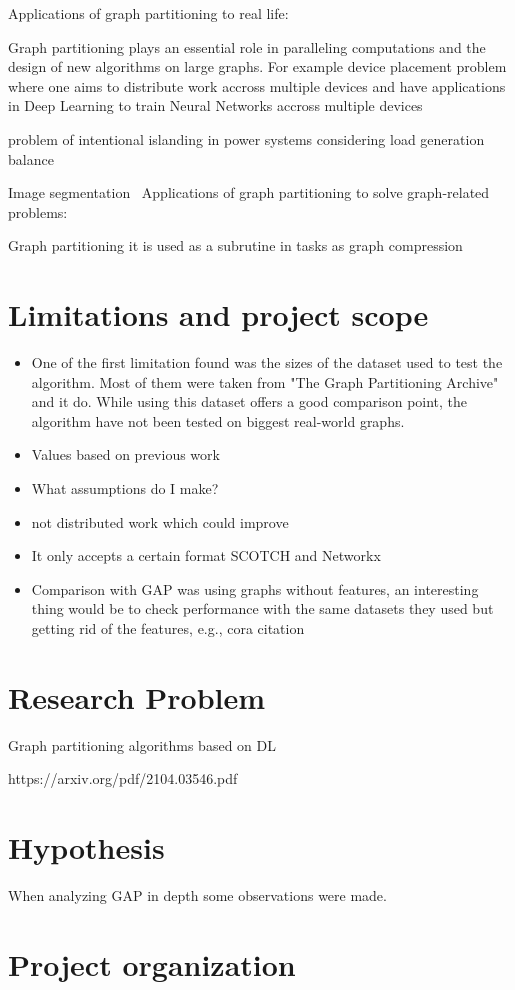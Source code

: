 Applications of graph partitioning to real life:

Graph partitioning plays an essential role in paralleling computations and the design of new algorithms on large graphs. For example device placement problem where one aims to distribute work accross multiple devices and have applications in Deep Learning to train Neural Networks accross multiple devices \cite{deviceplacement} 

problem of intentional islanding in power systems considering load generation balance ~ \cite{islanding}

Image segmentation~\cite{imagesegmentation}
Applications of graph partitioning to solve graph-related problems:

Graph partitioning it is used as a subrutine in tasks as graph compression ~ \cite{compressgraphs}
\section{Limitations and project scope}
\begin{itemize}
    \item One of the first limitation found was the sizes of the dataset used to test the algorithm. Most of them were taken from "The Graph Partitioning Archive" and it do. While using this dataset offers a good comparison point, the algorithm have not been tested on biggest real-world graphs.
    \item Values based on previous work
    \item What assumptions do I make?
    \item not distributed work which could improve
    \item It only accepts a certain format SCOTCH and Networkx
    \item Comparison with GAP was using graphs without features, an interesting thing would be to check performance with the same datasets they used but getting rid of the features, e.g., cora citation
\end{itemize}

\section{Research Problem}
Graph partitioning algorithms based on DL

https://arxiv.org/pdf/2104.03546.pdf
\section{Hypothesis}
When analyzing GAP in depth some observations were made.

\section{Project organization}

